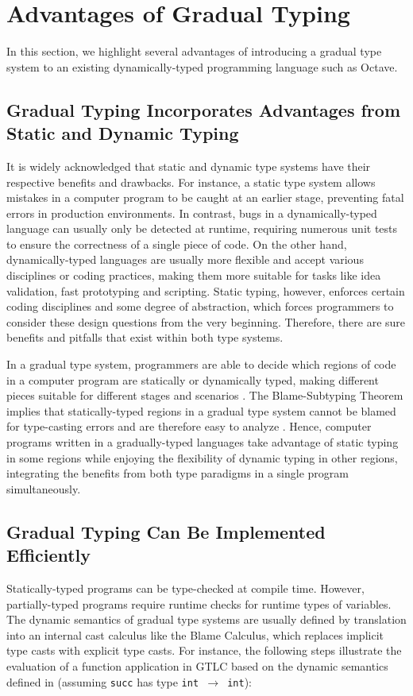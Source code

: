 \section{Advantages of Gradual Typing}
In this section, we highlight several advantages of introducing a gradual type system to an existing dynamically-typed programming language such as Octave.

\subsection{Gradual Typing Incorporates Advantages from Static and Dynamic Typing}
It is widely acknowledged that static and dynamic type systems have their respective benefits and drawbacks. For instance, a static type system allows mistakes in a computer program to be caught at an earlier stage, preventing fatal errors in production environments. In contrast, bugs in a dynamically-typed language can usually only be detected at runtime, requiring numerous unit tests to ensure the correctness of a single piece of code. On the other hand, dynamically-typed languages are usually more flexible and accept various disciplines or coding practices, making them more suitable for tasks like idea validation, fast prototyping and scripting. Static typing, however, enforces certain coding disciplines and some degree of abstraction, which forces programmers to consider these design questions from the very beginning. Therefore, there are sure benefits and pitfalls that exist within both type systems.

In a gradual type system, programmers are able to decide which regions of code in a computer program are statically or dynamically typed, making different pieces suitable for different stages and scenarios \cite{siek2006gradual}. The Blame-Subtyping Theorem implies that statically-typed regions in a gradual type system cannot be blamed for type-casting errors and are therefore easy to analyze \cite{siek2015refined}. Hence, computer programs written in a gradually-typed languages take advantage of static typing in some regions while enjoying the flexibility of dynamic typing in other regions, integrating the benefits from both type paradigms in a single program simultaneously.

\subsection{Gradual Typing Can Be Implemented Efficiently}
Statically-typed programs can be type-checked at compile time. However, partially-typed programs require runtime checks for runtime types of variables. The dynamic semantics of gradual type systems are usually defined by translation into an internal cast calculus like the Blame Calculus, which replaces implicit type casts with explicit type casts. For instance, the following steps illustrate the evaluation of a function application in GTLC based on the dynamic semantics defined in \cite{siek2006gradual} (assuming {\tt succ} has type {\tt int $\rightarrow$ int}):

